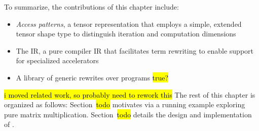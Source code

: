 To summarize, the contributions of this chapter include:
\begin{itemize}
\item \textit{Access patterns},
  a tensor representation that employs a
  simple, extended tensor shape type to
  distinguish iteration and computation dimensions

\item The \g IR,
  a pure compiler IR that facilitates 
  term rewriting to enable support for
  specialized accelerators
  
\item A library of generic rewrites over \g programs \hl{true?}
  
\end{itemize}

\hl{i moved related work, so probably need to rework this}
The rest of this chapter is organized as follows:
Section~\hl{todo} motivates
  \g via a running example exploring
  pure matrix multiplication.
Section~\hl{todo} details the
  design and implementation of \g.
